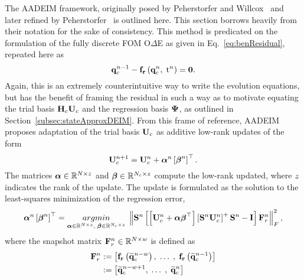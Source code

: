 The AADEIM framework, originally posed by Peherstorfer and Willcox~\cite{Peherstorfer2015} and later refined by Peherstorfer~\cite{Peherstorfer2020Adaptive} is outlined here. This section borrows heavily from their notation for the sake of consistency. This method is predicated on the formulation of the fully discrete FOM O$\Delta$E as given in Eq.~\ref{eq:benResidual}, repeated here as
%
\begin{equation}
	\mathbf{q}_{c}^{n-1} - \mathbf{f}_{\mathbf{r}}\left(\mathbf{q}_{c}^{n},\; \text{t}^{n}\right) = \mathbf{0}.
\end{equation}
%
Again, this is an extremely counterintuitive way to write the evolution equations, but has the benefit of framing the residual in such a way as to motivate equating the trial basis $\consScale \consTrial$ and the regression basis $\deimBasis$, as outlined in Section~\ref{subsec:stateApproxDEIM}. From this frame of reference, AADEIM proposes adaptation of the trial basis $\consTrial$ as additive low-rank updates of the form
%
\begin{equation}
	\consTrial^{\timeIdx+1} = \consTrial^{\timeIdx} + \adeimAlpha^{\timeIdx} \left[\adeimBeta^{\timeIdx}\right]^\top.
\end{equation}
%
The matrices $\boldsymbol{\alpha} \in \mathbb{R}^{N \times z}$ and $\boldsymbol{\beta} \in \mathbb{R}^{N_c \times z}$ compute the low-rank updated, where $z$ indicates the rank of the update. The update is formulated as the solution to the least-squares minimization of the regression error,
%
\begin{equation}\label{eq:aadeimAlphaBeta}
	\adeimAlpha^{\timeIdx} \left[\adeimBeta^{\timeIdx}\right]^\top = \argmin{\adeimAlpha \inRTwo{\numDOF}{\numRank},\; \adeimBeta \inRTwo{\numConsModes}{\numRank}} \left\Vert \sampMat^{\timeIdx} \left[\left[\consTrial^{\timeIdx} + \adeimAlpha \adeimBeta^\top \right] \left[\sampMat^{\timeIdx} \consTrial^{\timeIdx}\right]^+ \sampMat^{\timeIdx} - \identMat \right] \resWindow^{\timeIdx} \right\Vert_F^2,
\end{equation}
%
where the snapshot matrix $\resWindow^{\timeIdx} \inRTwo{\numDOF}{\numWindow}$ is defined as
%
\begin{align}
	\resWindow^{\timeIdx} &\defEq \left[\rhsResFunc{\consVecRom^{\timeIdx - \numWindow}}, \; \hdots \;, \; \rhsResFunc{\consVecRom^{\timeIdx - 1}}\right] \\
	&\defEq \left[\consVecRom^{\timeIdx - \numWindow + 1}, \; \hdots \;, \; \consVecRom^{\timeIdx} \right]
\end{align}
%
